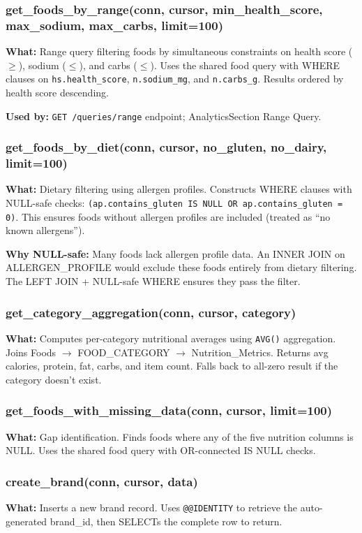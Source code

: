 \documentclass[12pt,a4paper]{article}
\begin{document}
\subsubsection{get\_foods\_by\_range(conn, cursor, min\_health\_score, max\_sodium, max\_carbs, limit=100)}
\textbf{What:} Range query filtering foods by simultaneous constraints on health score ($\ge$), sodium ($\le$), and carbs ($\le$). Uses the shared food query with WHERE clauses on \texttt{hs.health\_score}, \texttt{n.sodium\_mg}, and \texttt{n.carbs\_g}. Results ordered by health score descending.

\textbf{Used by:} \texttt{GET /queries/range} endpoint; AnalyticsSection Range Query.

\subsubsection{get\_foods\_by\_diet(conn, cursor, no\_gluten, no\_dairy, limit=100)}
\textbf{What:} Dietary filtering using allergen profiles. Constructs WHERE clauses with NULL-safe checks: \texttt{(ap.contains\_gluten IS NULL OR ap.contains\_gluten = 0)}. This ensures foods without allergen profiles are included (treated as ``no known allergens'').

\textbf{Why NULL-safe:} Many foods lack allergen profile data. An INNER JOIN on ALLERGEN\_PROFILE would exclude these foods entirely from dietary filtering. The LEFT JOIN + NULL-safe WHERE ensures they pass the filter.

\subsubsection{get\_category\_aggregation(conn, cursor, category)}
\textbf{What:} Computes per-category nutritional averages using \texttt{AVG()} aggregation. Joins Foods $\rightarrow$ FOOD\_CATEGORY $\rightarrow$ Nutrition\_Metrics. Returns avg calories, protein, fat, carbs, and item count. Falls back to all-zero result if the category doesn't exist.

\subsubsection{get\_foods\_with\_missing\_data(conn, cursor, limit=100)}
\textbf{What:} Gap identification. Finds foods where any of the five nutrition columns is NULL. Uses the shared food query with OR-connected IS NULL checks.

\subsubsection{create\_brand(conn, cursor, data)}
\textbf{What:} Inserts a new brand record. Uses \texttt{@@IDENTITY} to retrieve the auto-generated brand\_id, then SELECTs the complete row to return.
\end{document}
